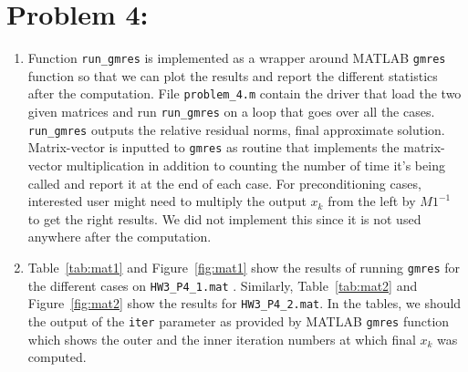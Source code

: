 \newpage
\section*{Problem 4:}
\begin{enumerate}
\item Function \texttt{run_gmres} is implemented as a wrapper around MATLAB \texttt{gmres} function so that we can plot the results and report the different statistics after the computation. File \texttt{problem_4.m} contain the driver that load the two given matrices and run \texttt{run_gmres} on a loop that goes over all the cases. \texttt{run_gmres} outputs the relative residual norms, final approximate solution. Matrix-vector is inputted to \texttt{gmres} as routine that implements the matrix-vector multiplication in addition to counting the number of time it's being called and report it at the end of each case. For preconditioning cases, interested user might need to multiply the output $x_{k}$ from the left by $M1^{-1}$ to get the right results. We did not implement this since it is not used anywhere after the computation. 

\item Table~\ref{tab:mat1} and Figure~\ref{fig:mat1} show the results of running \texttt{gmres} for the different cases on \texttt{HW3_P4_1.mat} . Similarly, Table~\ref{tab:mat2} and Figure~\ref{fig:mat2} show the results for \texttt{HW3_P4_2.mat}. In the tables, we should the output of the \texttt{iter} parameter as provided by MATLAB \texttt{gmres} function which shows the outer and
the inner iteration numbers at which final $x_{k}$ was computed.


\end{enumerate}
